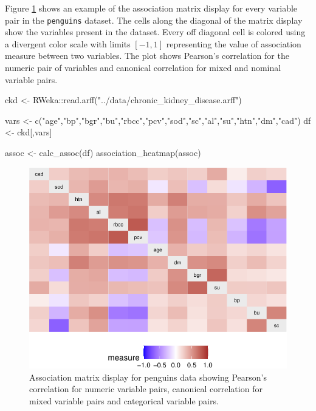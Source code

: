 Figure \ref{fig:assoc-heatmap} shows an example of the association
matrix display for every variable pair in the \texttt{penguins} dataset.
The cells along the diagonal of the matrix display show the variables
present in the dataset. Every off diagonal cell is colored using a
divergent color scale with limits \([-1,1]\) representing the value of
association measure between two variables. The plot shows Pearson's
correlation for the numeric pair of variables and canonical correlation
for mixed and nominal variable pairs.

\begin{Schunk}
\begin{Sinput}
ckd <- RWeka::read.arff("../data/chronic_kidney_disease.arff")

vars <- c("age","bp","bgr","bu","rbcc","pcv","sod","sc","al","su","htn","dm","cad")
df <- ckd[,vars]


assoc <- calc_assoc(df)
association_heatmap(assoc)
\end{Sinput}
\begin{figure}

{\centering \includegraphics{rj_paper_files/figure-latex/assoc-heatmap-1} 

}

\caption[Association matrix display for penguins data showing Pearson's correlation for numeric variable pairs, canonical correlation for mixed variable pairs and categorical variable pairs]{Association matrix display for penguins data showing Pearson's correlation for numeric variable pairs, canonical correlation for mixed variable pairs and categorical variable pairs.}\label{fig:assoc-heatmap}
\end{figure}
\end{Schunk}

